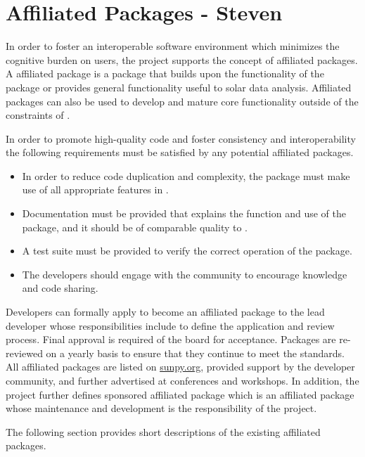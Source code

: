 \section{Affiliated Packages - Steven}
\label{sec:affil_package}


In order to foster an interoperable software environment which minimizes the cognitive burden on users, the \sunpy project supports the concept of affiliated packages.
A \sunpy affiliated package is a \python package that builds upon the functionality of the \sunpypkg package or provides general functionality useful to solar data analysis. Affiliated packages can also be used to develop and mature core functionality outside of the constraints of \sunpypkg.

In order to promote high-quality code and foster consistency and interoperability the following requirements must be satisfied by any potential affiliated packages.
\begin{itemize}
    \item In order to reduce code duplication and complexity, the package must make use of all appropriate features in \sunpypkg.
    \item Documentation must be provided that explains the function and use of the package, and it should be of comparable quality to \sunpypkg.
    \item A test suite must be provided to verify the correct operation of the package.
    \item The developers should engage with the community to encourage knowledge and code sharing.
\end{itemize}

Developers can formally apply to become an affiliated package to the \sunpy lead developer whose responsibilities include to define the application and review process. Final approval is required of the board for acceptance. Packages are re-reviewed on a yearly basis to ensure that they continue to meet the standards. All affiliated packages are listed on \url{sunpy.org}, provided support by the \sunpy developer community, and further advertised at conferences and workshops. In addition, the project further defines sponsored affiliated package which is an affiliated package whose maintenance and development is the responsibility of the \sunpy project.  

The following section provides short descriptions of the existing affiliated packages.
\label{sec:affil_packages}

